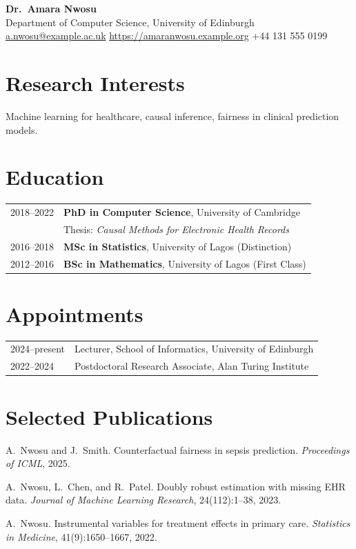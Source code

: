 \documentclass[11pt,a4paper]{article}
\begin{document}
\begin{center}
  {\LARGE\bfseries Dr.\ Amara Nwosu}\\[4pt]
  Department of Computer Science, University of Edinburgh\\
  \href{mailto:a.nwosu@example.ac.uk}{a.nwosu@example.ac.uk} \textbar{}
  \url{https://amaranwosu.example.org} \textbar{} +44 131 555 0199
\end{center}

\section{Research Interests}
Machine learning for healthcare, causal inference, fairness in clinical prediction models.

\section{Education}
\begin{tabular}{@{}p{}p{}@{}}
2018--2022 & \textbf{PhD in Computer Science}, University of Cambridge\\
           & Thesis: \emph{Causal Methods for Electronic Health Records}\\[4pt]
2016--2018 & \textbf{MSc in Statistics}, University of Lagos (Distinction)\\[4pt]
2012--2016 & \textbf{BSc in Mathematics}, University of Lagos (First Class)
\end{tabular}

\section{Appointments}
\begin{tabular}{@{}p{}p{}@{}}
2024--present & Lecturer, School of Informatics, University of Edinburgh\\
2022--2024    & Postdoctoral Research Associate, Alan Turing Institute
\end{tabular}

\section{Selected Publications}
\begin{enumerate}[leftmargin=*, label={[\arabic*]}]
  \item A.~Nwosu and J.~Smith. Counterfactual fairness in sepsis prediction.
        \emph{Proceedings of ICML}, 2025.
  \item A.~Nwosu, L.~Chen, and R.~Patel. Doubly robust estimation with missing EHR data.
        \emph{Journal of Machine Learning Research}, 24(112):1--38, 2023.
  \item A.~Nwosu. Instrumental variables for treatment effects in primary care.
        \emph{Statistics in Medicine}, 41(9):1650--1667, 2022.
\end{enumerate}
\end{document}
